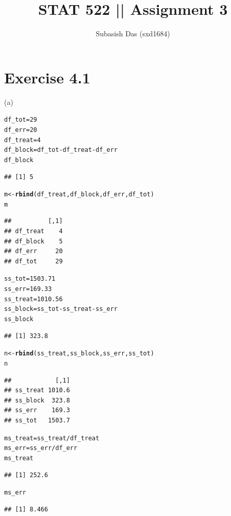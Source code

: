 \documentclass[a4paper]{article}\usepackage{graphicx, color}
\makeatletter
\newcommand{\hlfunctioncall}[1]{\textcolor[rgb]{0.501960784313725,0,0.329411764705882}{\textbf{#1}}}%
\newenvironment{kframe}{%
 \def\at@end@of@kframe{}%
 \ifinner\ifhmode%
  \def\at@end@of@kframe{\end{minipage}}%
  \begin{minipage}{\columnwidth}%
 \fi\fi%
 \def\FrameCommand##1{\hskip\@totalleftmargin \hskip-\fboxsep
 \colorbox{shadecolor}{##1}\hskip-\fboxsep
     \hskip-\linewidth \hskip-\@totalleftmargin \hskip\columnwidth}%
 \MakeFramed {\advance\hsize-\width
   \@totalleftmargin\z@ \linewidth\hsize
   \@setminipage}}%
 {\par\unskip\endMakeFramed%
 \at@end@of@kframe}
\newenvironment{knitrout}{}{} %
\makeatother
\begin{document}
\title{STAT 522 || Assignment 3}
\author{Subasish Das (sxd1684)}
\maketitle

\section{ Exercise 4.1}

(a)

\begin{knitrout}
\color{fgcolor}\begin{kframe}
\begin{alltt}

df_tot = 29
df_err = 20
df_treat = 4
df_block = df_tot - df_treat - df_err
df_block
\end{alltt}
\begin{verbatim}
## [1] 5
\end{verbatim}
\begin{alltt}
m <- \hlfunctioncall{rbind}(df_treat, df_block, df_err, df_tot)
m
\end{alltt}
\begin{verbatim}
##          [,1]
## df_treat    4
## df_block    5
## df_err     20
## df_tot     29
\end{verbatim}
\begin{alltt}

ss_tot = 1503.71
ss_err = 169.33
ss_treat = 1010.56
ss_block = ss_tot - ss_treat - ss_err
ss_block
\end{alltt}
\begin{verbatim}
## [1] 323.8
\end{verbatim}
\begin{alltt}
n <- \hlfunctioncall{rbind}(ss_treat, ss_block, ss_err, ss_tot)
n
\end{alltt}
\begin{verbatim}
##            [,1]
## ss_treat 1010.6
## ss_block  323.8
## ss_err    169.3
## ss_tot   1503.7
\end{verbatim}
\begin{alltt}

ms_treat = ss_treat/df_treat
ms_err = ss_err/df_err
ms_treat
\end{alltt}
\begin{verbatim}
## [1] 252.6
\end{verbatim}
\begin{alltt}
ms_err
\end{alltt}
\begin{verbatim}
## [1] 8.466
\end{verbatim}
\begin{alltt}


\end{alltt}
\end{kframe}
\end{knitrout}
\end{document}
